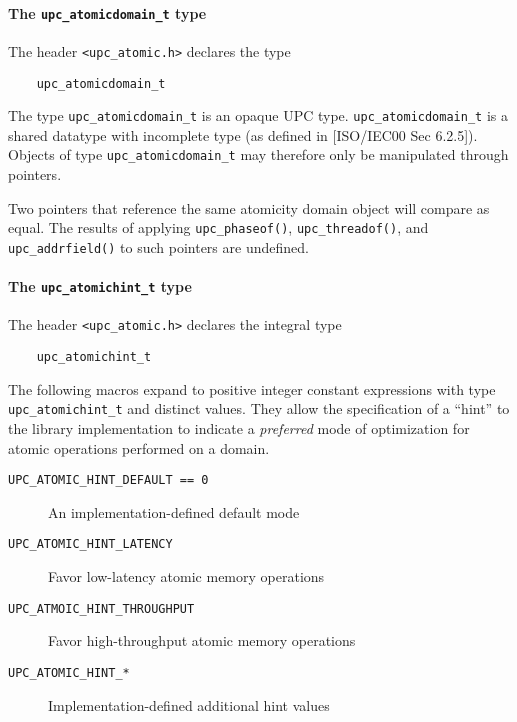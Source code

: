 \paragraph{The {\tt upc\_atomicdomain\_t} type}

\npf The header {\tt <upc\_atomic.h>} declares the type
\begin{verbatim}
    upc_atomicdomain_t
\end{verbatim}

\np The type {\tt upc\_atomicdomain\_t} is an opaque UPC type.
    {\tt upc\_atomicdomain\_t} is a shared datatype with incomplete type (as 
    defined in [ISO/IEC00 Sec 6.2.5]).  Objects of type {\tt upc\_atomicdomain\_t}
    may therefore only be manipulated through pointers.

\np Two pointers that reference the same atomicity domain object will compare
    as equal.  The results of applying {\tt upc\_phaseof()},
    {\tt upc\_threadof()}, and {\tt upc\_addrfield()} to such pointers are
    undefined.

\paragraph{The {\tt upc\_atomichint\_t} type}

\npf The header {\tt <upc\_atomic.h>} declares the integral type
\begin{verbatim}
    upc_atomichint_t
\end{verbatim}

\np The following macros expand to positive integer constant expressions 
    with type {\tt upc\_atomichint\_t} and distinct values.
    They allow the specification of a ``hint'' to the library implementation to indicate
    a \emph{preferred} mode of optimization for atomic operations performed on a domain.
\begin{description}
  \item[{\tt UPC\_ATOMIC\_HINT\_DEFAULT == 0}]
    An implementation-defined default mode
  \item[{\tt UPC\_ATOMIC\_HINT\_LATENCY}]
    Favor low-latency atomic memory operations
  \item[{\tt UPC\_ATMOIC\_HINT\_THROUGHPUT}]
    Favor high-throughput atomic memory operations
  \item[{\tt UPC\_ATOMIC\_HINT\_*}]
    Implementation-defined additional hint values
\end{description}

